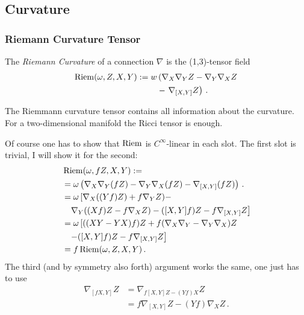 \documentclass[11pt, a4paper, twocolumn]{article} %
\begin{document}
\subsection{Curvature}
\subsubsection{Riemann Curvature Tensor}
\begin{defn}
    The \textit{Riemann Curvature} of a connection $\nabla$ is the
    (1,3)-tensor field
    \begin{align}
        \nonumber \operatorname{Riem}(\omega, Z, X, Y) := w&\left( \nabla_X \nabla_Y Z - \nabla_Y\nabla_X Z \right.\\
        &-\left. \nabla_{[X,Y]}Z \right)\,.
        \label{eq:RiemannCurvature}
    \end{align}
\end{defn}
\begin{note}
    The Riemmann curvature tensor contains all information about the curvature.
    For a two-dimensional manifold the Ricci tensor is enough.
\end{note}
\begin{note}
    Of course one has to show that $\operatorname{Riem}$ is $C^\infty$-linear in each slot. 
    The first slot is trivial, I will show it for the second:
    \begin{align*}
         &\operatorname{Riem}(\omega, fZ, X, Y) := \\ 
         &=\omega\left( \nabla_X \nabla_Y (fZ) - \nabla_Y\nabla_X (fZ) - \nabla_{[X,Y]}(fZ) \right)\,.\\
         &=\omega\left[ \nabla_X( (Yf)Z) + f\nabla_Y Z) - \right.\\
         &\phantom{=}\left.\nabla_Y( (Xf)Z - f\nabla_X Z) - ([X,Y]f)Z - f\nabla_{[X,Y]}Z\right]\\
         &= \omega\left[ ( (XY - YX) f )Z + f(\nabla_X\nabla_Y - \nabla_Y\nabla_X)Z\right.\\
         &\phantom{=} \left. - ([X,Y]f)Z - f\nabla_{[X,Y]}Z\right]\\
         &= f \operatorname{Riem}(\omega, Z, X, Y)\,.
     \end{align*}
     The third (and by symmetry also forth) argument works the same, one just has to use
     \begin{align}
         \nonumber\nabla_{[fX,Y]}Z &= \nabla_{f[X,Y]Z - (Yf)X}Z  \\
         &=f\nabla_{[X,Y]}Z - (Yf)\nabla_X Z\,.
     \end{align}
\end{note}
\end{document}
